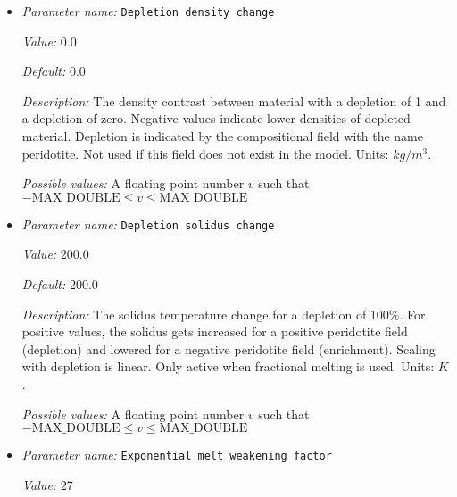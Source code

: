 \begin{itemize}
\item {\it Parameter name:} {\tt Depletion density change}
\label{parameters:Material model/Melt global/Depletion density change}
\label{parameters:Material_20model/Melt_20global/Depletion_20density_20change}


{\it Value:} 0.0


{\it Default:} 0.0


{\it Description:} The density contrast between material with a depletion of 1 and a depletion of zero. Negative values indicate lower densities of depleted material. Depletion is indicated by the compositional field with the name peridotite. Not used if this field does not exist in the model. Units: $kg/m^3$.


{\it Possible values:} A floating point number $v$ such that $-\text{MAX\_DOUBLE} \leq v \leq \text{MAX\_DOUBLE}$
\item {\it Parameter name:} {\tt Depletion solidus change}
\label{parameters:Material model/Melt global/Depletion solidus change}
\label{parameters:Material_20model/Melt_20global/Depletion_20solidus_20change}


{\it Value:} 200.0


{\it Default:} 200.0


{\it Description:} The solidus temperature change for a depletion of 100\%. For positive values, the solidus gets increased for a positive peridotite field (depletion) and lowered for a negative peridotite field (enrichment). Scaling with depletion is linear. Only active when fractional melting is used. Units: $K$.


{\it Possible values:} A floating point number $v$ such that $-\text{MAX\_DOUBLE} \leq v \leq \text{MAX\_DOUBLE}$
\item {\it Parameter name:} {\tt Exponential melt weakening factor}
\label{parameters:Material model/Melt global/Exponential melt weakening factor}
\label{parameters:Material_20model/Melt_20global/Exponential_20melt_20weakening_20factor}


{\it Value:} 27



\end{itemize}
